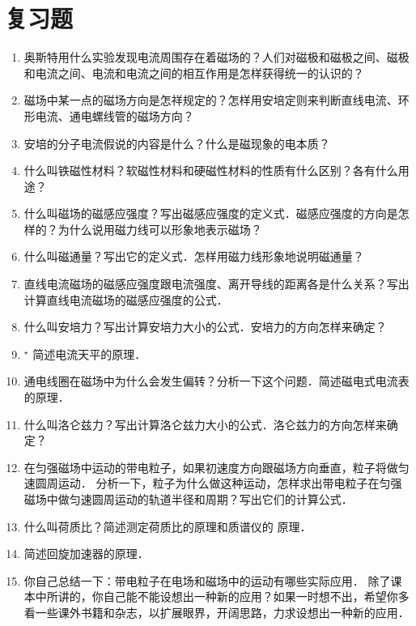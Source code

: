 \section*{复习题}
\begin{enumerate}
    \item 奥斯特用什么实验发现电流周围存在着磁场的？人们对磁极和磁极之间、磁极和电流之间、电流和电流之间的相互作用是怎样获得统一的认识的？
    \item 磁场中某一点的磁场方向是怎祥规定的？怎样用安培定则来判断直线电流、环形电流、通电螺线管的磁场方向？
    \item 安培的分子电流假说的内容是什么？什么是磁现象的电本质？
    \item 什么叫铁磁性材料？软磁性材料和硬磁性材料的性质有什么区别？各有什么用途？
    \item 什么叫磁场的磁感应强度？写出磁感应强度的定义式．磁感应强度的方向是怎样的？为什么说用磁力线可以形象地表示磁场？
    \item 什么叫磁通量？写出它的定义式．怎样用磁力线形象地说明磁通量？
    
    \item 直线电流磁场的磁感应强度跟电流强度、离开导线的距离各是什么关系？写出计算直线电流磁场的磁感应强度的公式．
    \item 什么叫安培力？写出计算安培力大小的公式．安培力的方向怎样来确定？
    \item$^\star$ 简述电流天平的原理．\item 通电线圈在磁场中为什么会发生偏转？分析一下这个问题．简述磁电式电流表的原理．
    \item 什么叫洛仑兹力？写出计算洛仑兹力大小的公式．洛仑兹力的方向怎样来确定？
    \item 在匀强磁场中运动的带电粒子，如果初速度方向跟磁场方向垂直，粒子将做匀速圆周运动．
    分析一下，粒子为什么做这种运动，怎样求出带电粒子在匀强磁场中做匀速圆周运动的轨道半径和周期？写出它们的计算公式．
    \item 什么叫荷质比？简述测定荷质比的原理和质谱仪的
    原理．
    \item 简述回旋加速器的原理．
    \item 你自己总结一下：带电粒子在电场和磁场中的运动有哪些实际应用．
    除了课本中所讲的，你自己能不能设想出一种新的应用？如果一时想不出，希望你多看一些课外书籍和杂志，以扩展眼界，开阔思路，力求设想出一种新的应用．
\end{enumerate}

